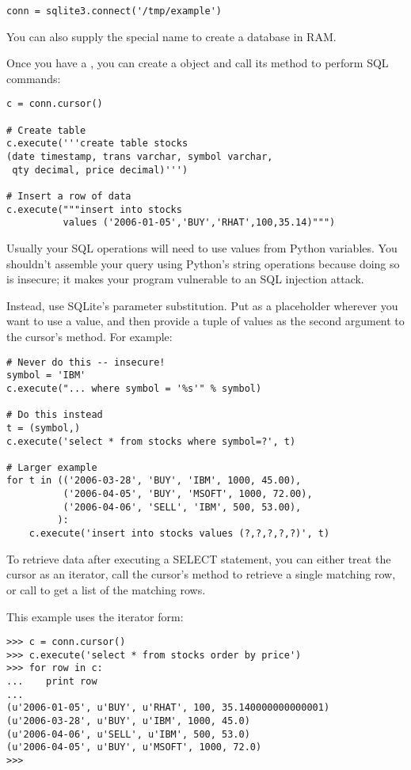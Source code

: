 \documentclass{howto}
\begin{document}
\begin{verbatim}
conn = sqlite3.connect('/tmp/example')
\end{verbatim}

You can also supply the special name  to create
a database in RAM.

Once you have a , you can create a  
object and call its  method to perform SQL commands:

\begin{verbatim}
c = conn.cursor()

# Create table
c.execute('''create table stocks
(date timestamp, trans varchar, symbol varchar,
 qty decimal, price decimal)''')

# Insert a row of data
c.execute("""insert into stocks
          values ('2006-01-05','BUY','RHAT',100,35.14)""")
\end{verbatim}    

Usually your SQL operations will need to use values from Python
variables.  You shouldn't assemble your query using Python's string
operations because doing so is insecure; it makes your program
vulnerable to an SQL injection attack.  

Instead, use SQLite's parameter substitution.  Put  as a
placeholder wherever you want to use a value, and then provide a tuple
of values as the second argument to the cursor's 
method.  For example:

\begin{verbatim}    
# Never do this -- insecure!
symbol = 'IBM'
c.execute("... where symbol = '%s'" % symbol)

# Do this instead
t = (symbol,)
c.execute('select * from stocks where symbol=?', t)

# Larger example
for t in (('2006-03-28', 'BUY', 'IBM', 1000, 45.00),
          ('2006-04-05', 'BUY', 'MSOFT', 1000, 72.00),
          ('2006-04-06', 'SELL', 'IBM', 500, 53.00),
         ):
    c.execute('insert into stocks values (?,?,?,?,?)', t)
\end{verbatim}

To retrieve data after executing a SELECT statement, you can either 
treat the cursor as an iterator, call the cursor's 
method to retrieve a single matching row, 
or call  to get a list of the matching rows.

This example uses the iterator form:

\begin{verbatim}
>>> c = conn.cursor()
>>> c.execute('select * from stocks order by price')
>>> for row in c:
...    print row
...
(u'2006-01-05', u'BUY', u'RHAT', 100, 35.140000000000001)
(u'2006-03-28', u'BUY', u'IBM', 1000, 45.0)
(u'2006-04-06', u'SELL', u'IBM', 500, 53.0)
(u'2006-04-05', u'BUY', u'MSOFT', 1000, 72.0)
>>>
\end{verbatim}
\end{document}
